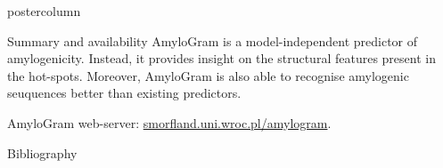 \documentclass[final]{beamer}\usepackage[]{graphicx}\usepackage[]{color}
\begin{document}
\begin{frame}
\begin{columns}
\begin{column}{.525\textwidth}
\begin{beamercolorbox}[center,wd=\textwidth]{postercolumn}
\begin{minipage}[T]{.95\textwidth}
{\begin{block}{Summary and availability}
AmyloGram is a model-independent predictor of amylogenicity. Instead, it provides insight on the structural features present in the hot-spots. Moreover, AmyloGram is also able to recognise amylogenic seuquences better than existing predictors.

\medskip

AmyloGram web-server: \url{smorfland.uni.wroc.pl/amylogram}.
\end{block}
\vfill


\begin{block}{Bibliography}
  \tiny{
  
  
  }
  \end{block}
  \vfill

}
\end{minipage}
\end{beamercolorbox}
\end{column}
\end{columns}  
\end{frame}
\end{document}
